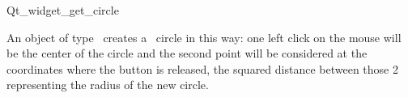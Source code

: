 
\begin{ccRefClass}{Qt_widget_get_circle}

\ccDefinition
An object of type \ccRefName\ creates a \cgal\ circle in this way: one 
left click on the mouse will be the center of the circle and the second point will be considered at the coordinates where the button is released, the squared distance between those 2 representing the radius of the new circle.


\ccInheritsFrom
{}

\ccGlue

\ccCreation
{}


\end{ccRefClass}









